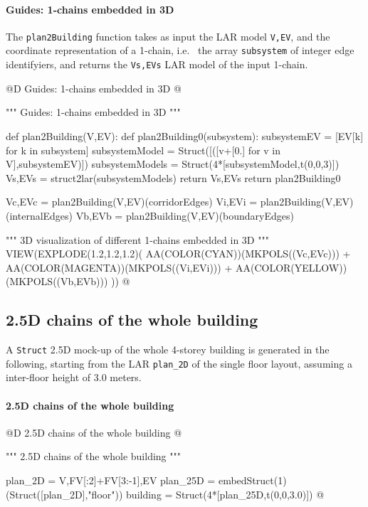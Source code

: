 \documentclass[11pt,oneside]{article}    %
\begin{document}
\paragraph{Guides: 1-chains embedded in 3D}

The \texttt{plan2Building} function takes as input the LAR model \texttt{V,EV}, and the coordinate representation of a 1-chain, i.e.~ the array \texttt{subsystem} of integer edge identifyiers, and returns the \texttt{Vs,EVs} LAR model of the input 1-chain.

@D Guides: 1-chains embedded in 3D
@{""" Guides: 1-chains embedded in 3D """

def plan2Building(V,EV):
    def plan2Building0(subsystem):
        subsystemEV = [EV[k] for k in subsystem]
        subsystemModel = Struct([([v+[0.] for v in V],subsystemEV)])
        subsystemModels = Struct(4*[subsystemModel,t(0,0,3)])
        Vs,EVs = struct2lar(subsystemModels)
        return Vs,EVs
    return plan2Building0

Vc,EVc = plan2Building(V,EV)(corridorEdges)
Vi,EVi = plan2Building(V,EV)(internalEdges)
Vb,EVb = plan2Building(V,EV)(boundaryEdges)

""" 3D visualization of different 1-chains embedded in 3D """
VIEW(EXPLODE(1.2,1.2,1.2)(
    AA(COLOR(CYAN))(MKPOLS((Vc,EVc))) + AA(COLOR(MAGENTA))(MKPOLS((Vi,EVi))) +
    AA(COLOR(YELLOW))(MKPOLS((Vb,EVb))) ))
@}

\subsection{2.5D chains of the whole building}

A \texttt{Struct} 2.5D mock-up of the whole 4-storey building is generated in the following, starting from the LAR \texttt{plan\_2D} of the single floor layout, assuming a inter-floor height of 3.0 meters. 

\paragraph{2.5D chains of the whole building}
@D 2.5D chains of the whole building
@{""" 2.5D chains of the whole building """

plan_2D = V,FV[:2]+FV[3:-1],EV
plan_25D = embedStruct(1)(Struct([plan_2D],"floor"))
building = Struct(4*[plan_25D,t(0,0,3.0)])
@}
\end{document}
